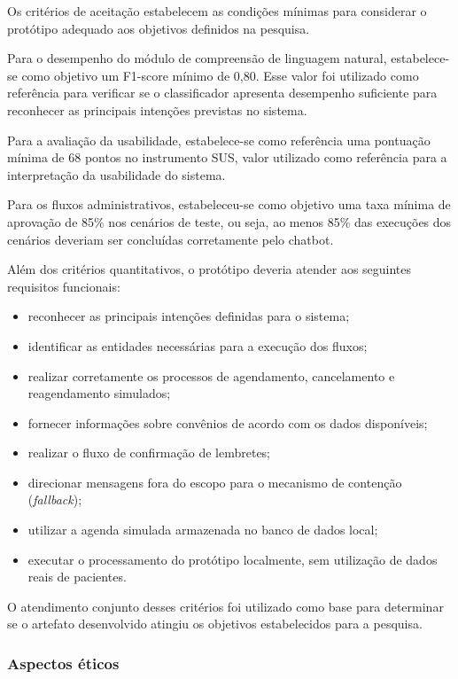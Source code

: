\documentclass[12pt,a4paper]{extarticle}
\begin{document}
Os critérios de aceitação estabelecem as condições mínimas para considerar o protótipo adequado aos objetivos definidos na pesquisa.

Para o desempenho do módulo de compreensão de linguagem natural, estabelece-se como objetivo um F1-score mínimo de 0,80. Esse valor foi utilizado como referência para verificar se o classificador apresenta desempenho suficiente para reconhecer as principais intenções previstas no sistema.

Para a avaliação da usabilidade, estabelece-se como referência uma pontuação mínima de 68 pontos no instrumento SUS, valor utilizado como referência para a interpretação da usabilidade do sistema.

Para os fluxos administrativos, estabeleceu-se como objetivo uma taxa mínima de aprovação de 85\% nos cenários de teste, ou seja, ao menos 85\% das execuções dos cenários deveriam ser concluídas corretamente pelo chatbot.

Além dos critérios quantitativos, o protótipo deveria atender aos seguintes requisitos funcionais:

\begin{itemize}
    \item reconhecer as principais intenções definidas para o sistema;
    \item identificar as entidades necessárias para a execução dos fluxos;
    \item realizar corretamente os processos de agendamento, cancelamento e reagendamento simulados;
    \item fornecer informações sobre convênios de acordo com os dados disponíveis;
    \item realizar o fluxo de confirmação de lembretes;
    \item direcionar mensagens fora do escopo para o mecanismo de contenção (\textit{fallback});
    \item utilizar a agenda simulada armazenada no banco de dados local;
    \item executar o processamento do protótipo localmente, sem utilização de dados reais de pacientes.
\end{itemize}

O atendimento conjunto desses critérios foi utilizado como base para determinar se o artefato desenvolvido atingiu os objetivos estabelecidos para a pesquisa.


\subsubsection{Aspectos éticos}
\label{sec:aspectos-eticos}
\end{document}

